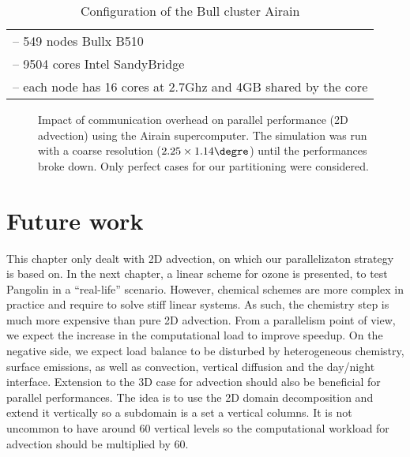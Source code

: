 \begin{table}[t]
\caption{Configuration of the Bull cluster Airain}
\centering
\begin{tabular}{l}
\toprule
-- 549 nodes Bullx B510\\
-- 9504 cores Intel SandyBridge\\
-- each node has 16 cores at 2.7Ghz and 4GB shared by the core\\
\bottomrule
\end{tabular}
\label{tab:cluster_airain}
\end{table}

\begin{figure}
  \hfill
  \caption{%
    Impact of communication overhead on parallel performance (2D advection)
    using the Airain supercomputer. The simulation was run with a coarse
    resolution ($2.25\times1.14\degre$) until the performances broke
    down. Only perfect cases for our partitioning were considered.}
\end{figure}

\section{Future work}
\label{sec:future_work}
This chapter only dealt with 2D advection, on which our parallelizaton strategy is
based on.  In the next chapter, a linear scheme for ozone is presented, to test
Pangolin in a ``real-life'' scenario. However, chemical schemes are more complex
in practice and require to solve stiff linear systems. As such, the chemistry
step is much more expensive than pure 2D advection. From a parallelism point of
view, we expect the increase in the computational load to improve speedup. On
the negative side, we expect load balance to be disturbed by heterogeneous
chemistry, surface emissions, as well as convection, vertical diffusion and the
day/night interface.  Extension to the 3D case for advection should also be
beneficial for parallel performances. The idea is to use the 2D domain
decomposition and extend it vertically so a subdomain is a set a vertical
columns. It is not uncommon to have around 60 vertical levels so the
computational workload for advection should be multiplied by 60. 

